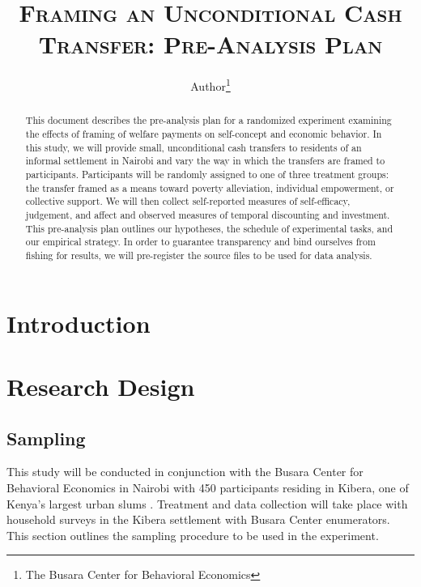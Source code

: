 \documentclass[11pt, a4paper]{article}\usepackage[]{graphicx}\usepackage[]{color}
\begin{document}
\title{\textsc{Framing an Unconditional Cash Transfer: Pre-Analysis Plan}}
\author{Author\footnote{The Busara Center for Behavioral Economics}}

\maketitle

\begin{abstract}

    This document describes the pre-analysis plan for a randomized experiment examining the effects of framing of welfare payments on self-concept and economic behavior. In this study, we will provide small, unconditional cash transfers to residents of an informal settlement in Nairobi and vary the way in which the transfers are framed to participants. Participants will be randomly assigned to one of three treatment groups: the transfer framed as a means toward poverty alleviation, individual empowerment, or collective support. We will then collect self-reported measures of self-efficacy, judgement, and affect and observed measures of temporal discounting and investment. This pre-analysis plan outlines our hypotheses, the schedule of experimental tasks, and our empirical strategy. In order to guarantee transparency and bind ourselves from fishing for results, we will pre-register the source files to be used for data analysis.

\end{abstract}

\newpage

\tableofcontents

\newpage

\section{Introduction}

\section{Research Design}

    \subsection{Sampling}

        This study will be conducted in conjunction with the Busara Center for Behavioral Economics in Nairobi with 450 participants residing in Kibera, one of Kenya's largest urban slums \parencite{haushofer_methodology_2014}. Treatment and data collection will take place with household surveys in the Kibera settlement with Busara Center enumerators. This section outlines the sampling procedure to be used in the experiment.
\end{document}
